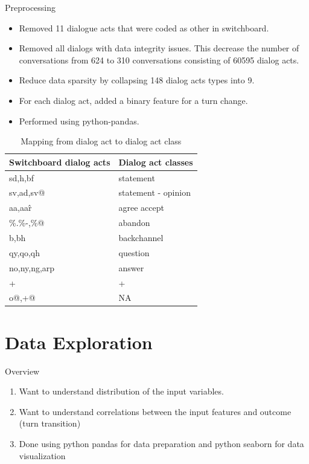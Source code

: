 \begin{frame}{Preprocessing}
 \begin{itemize}
    \item Removed 11 dialogue acts that were coded as other in switchboard.
    \item Removed all dialogs with
     data integrity issues. This decrease the number of conversations from 624 to 310 conversations consisting of 60595 dialog acts.
    \item Reduce data sparsity by collapsing 148 dialog acts types into 9.
    \item For each dialog act, added a binary feature for a turn change.
    \item Performed using python-pandas.
  \end{itemize}

  \begin{table}
     \begin{center}
     \begin{tabular}{l | l}
    \hline
Switchboard dialog acts &  Dialog act classes  \\
    \hline
sd,h,bf      & statement   \\
sv,ad,sv@    & statement - opinion  \\
aa,aa\^r     & agree accept \\
\%.\%-,\%@   & abandon      \\
b,bh         & backchannel  \\
qy,qo,qh     & question     \\
no,ny,ng,arp & answer       \\
+            & +            \\
o@,+@        & NA           \\
  \hline
\end{tabular}
\end{center}\vspace{-0.5em}
\caption{Mapping from dialog act to dialog act class}
\label{tab:mapping}
\end{table}

\end{frame}{}


\section{Data Exploration}
\frame{\sectionpage}

\begin{frame}{Overview}
     \begin{enumerate}
          \item Want to understand distribution of the input variables.
          \item Want to understand correlations between the input features and outcome (turn transition)
          \item Done using python pandas for data preparation and python seaborn for data visualization
      \end{enumerate}
\end{frame}


